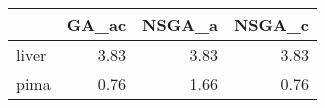 \begin{tabular}{lrrr}
\toprule
{} &  GA\_ac &  NSGA\_a &  NSGA\_c \\
\midrule
liver &   3.83 &    3.83 &    3.83 \\
pima  &   0.76 &    1.66 &    0.76 \\
\bottomrule
\end{tabular}
